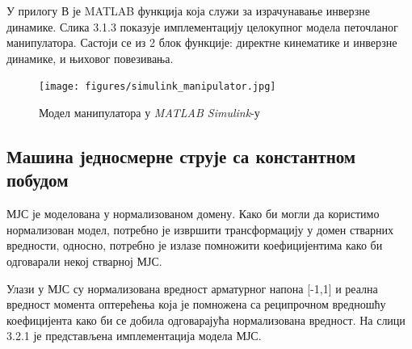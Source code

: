 \documentclass[12pt]{article}
\begin{document}
У прилогу В је MATLAB функција која служи за израчунавање инверзне динамике.
Слика 3.1.3 показује имплементацију целокупног модела петочланог манипулатора. Састоји се из 2 блок функције: директне кинематике и инверзне динамике, и њиховог повезивања.

\begin{figure}[H]
    \centering
    \texttt{[image: figures/simulink\_manipulator.jpg]}
    \caption{Модел манипулатора у \textit{MATLAB Simulink}-у}
    \label{fig:манипулатор_simulink}
\end{figure}

\subsection{Машина једносмерне струје са константном побудом}
МЈС је моделована у нормализованом домену. Како би могли да користимо нормализован модел, потребно је извршити трансформацију у домен стварних вредности, односно, потребно је излазе помножити коефицијентима како би одговарали некој стварној МЈС.

Улази у МЈС су нормализована вредност арматурног напона [-1,1] и реална вредност момента оптерећења која је помножена са реципрочном вредношћу коефицијента како би се добила одговарајућа нормализована вредност. На слици 3.2.1 је представљена имплементација модела МЈС.
\end{document}
